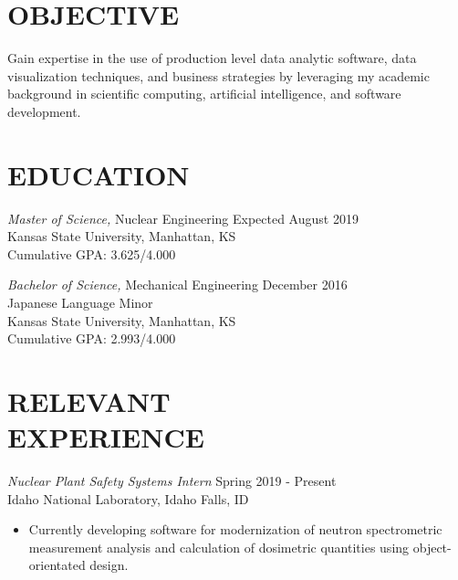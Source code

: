 \documentclass[margin, 10pt]{res} %
\begin{document}
\begin{resume}
 
\section{OBJECTIVE}  

Gain expertise in the use of production level data analytic software, data visualization techniques, and business strategies by leveraging my academic background in scientific computing, artificial intelligence, and software development.

\section{EDUCATION}

{\sl Master of Science,} Nuclear Engineering \hfill Expected August 2019\\
Kansas State University, Manhattan, KS \\
Cumulative GPA: 3.625/4.000

{\sl Bachelor of Science,} Mechanical Engineering \hfill December 2016 \\
Japanese Language Minor \\
Kansas State University, Manhattan, KS \\
Cumulative GPA: 2.993/4.000


\section{RELEVANT \\ EXPERIENCE}


{\sl Nuclear Plant Safety Systems Intern} \hfill Spring 2019 - Present \\
Idaho National Laboratory, Idaho Falls, ID
\begin{itemize}
    \item Currently developing software for modernization of neutron spectrometric measurement analysis and calculation of dosimetric quantities using object-orientated design.
\end{itemize}


\end{resume}
\end{document}
